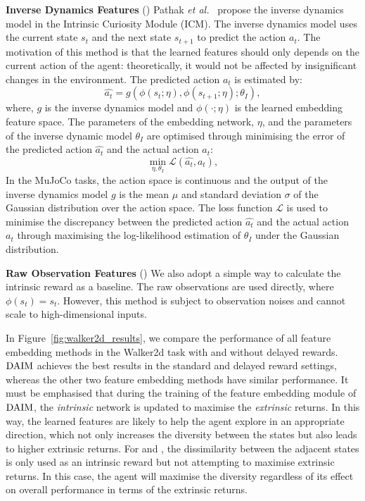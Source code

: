 \noindent\textbf{Inverse Dynamics Features} () Pathak \textit{et al.}~\cite{pathak2017curiosity} propose the inverse dynamics model in the Intrinsic Curiosity Module (ICM). The inverse dynamics model uses the current state $s_{t}$ and the next state $s_{t+1}$ to predict the action $a_{t}$. The motivation of this method is that the learned features should only depends on the current action of the agent: theoretically, it would not be affected by insignificant changes in the environment. The predicted action $a_{t}$ is estimated by:
\begin{equation}
    \widehat{a_{t}} = g(\phi(s_{t};\eta), \phi(s_{t+1};\eta);\theta_{I}),
\end{equation}
where, $g$ is the inverse dynamics model and $\phi(\cdot;\eta)$ is the learned embedding feature space. The parameters of the embedding network, $\eta$, and the parameters of the inverse dynamic model $\theta_{I}$ are optimised through minimising the error of the predicted action $\widehat{a_{t}}$ and the actual action $a_{t}$:
\begin{equation}
    \min_{\eta, \theta_{I}}\mathcal{L}(\widehat{a_{t}}, a_{t}),
\end{equation}
In the MuJoCo tasks, the action space is continuous and the output of the inverse dynamics model $g$ is the mean $\mu$ and standard deviation $\sigma$ of the Gaussian distribution over the action space. The loss function $\mathcal{L}$ is used to minimise the discrepancy between the predicted action $\widehat{a_{t}}$ and the actual action $a_{t}$ through maximising the log-likelihood estimation of $\theta_{I}$ under the Gaussian distribution.

\noindent\textbf{Raw Observation Features} () We also adopt a simple way to calculate the intrinsic reward as a baseline. The raw observations are used directly, where $\phi(s_{t})=s_{t}$. However, this method is subject to observation noises and cannot scale to high-dimensional inputs.

In Figure~\ref{fig:walker2d_results}, we compare the performance of all feature embedding methods in the Walker2d task with and without delayed rewards. $\text{DAIM}$ achieves the best results in the standard and delayed reward settings, whereas the other two feature embedding methods have similar performance. It must be emphasised that during the training of the feature embedding module of $\text{DAIM}$, the {\em intrinsic} network is updated to maximise the {\em extrinsic} returns. In this way, the learned features are likely to help the agent explore in an appropriate direction, which not only increases the diversity between the states but also leads to higher extrinsic returns. For  and , the dissimilarity between the adjacent states is only used as an intrinsic reward but not attempting to maximise extrinsic returns. In this case, the agent will maximise the diversity regardless of its effect on overall performance in terms of the extrinsic returns.


